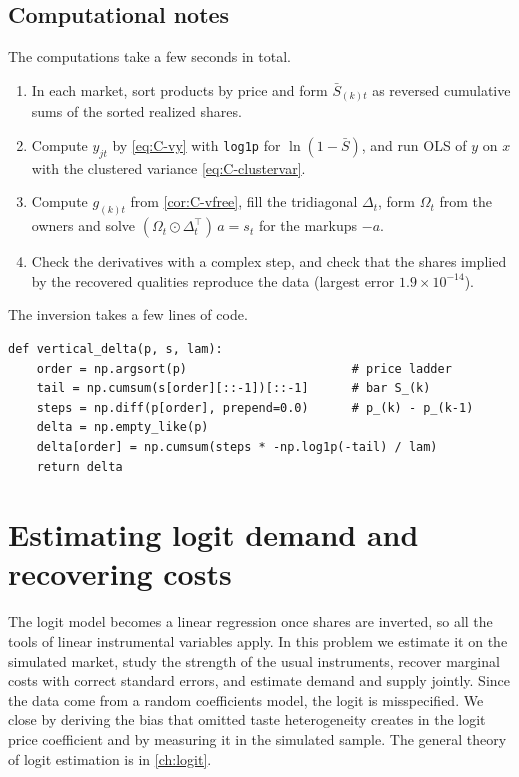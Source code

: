 \subsection{Computational notes}

The computations take a few seconds in total.
\begin{enumerate}
  \item In each market, sort products by price and form $\bar S_{(k)t}$ as reversed cumulative sums of the sorted
  realized shares.
  \item Compute $y_{jt}$ by \eqref{eq:C-vy} with \texttt{log1p} for $\ln(1 - \bar S)$, and run OLS of $y$ on $x$ with the
  clustered variance \eqref{eq:C-clustervar}.
  \item Compute $g_{(k)t}$ from \cref{cor:C-vfree}, fill the tridiagonal $\Delta_t$, form $\Omega_t$ from the owners and
  solve $(\Omega_t \odot \Delta_t^\top)\,a = s_t$ for the markups $-a$.
  \item Check the derivatives with a complex step, and check that the shares implied by the recovered qualities
  reproduce the data (largest error $1.9\times10^{-14}$).
\end{enumerate}
The inversion takes a few lines of code.
\begin{verbatim}
def vertical_delta(p, s, lam):
    order = np.argsort(p)                       # price ladder
    tail = np.cumsum(s[order][::-1])[::-1]      # bar S_(k)
    steps = np.diff(p[order], prepend=0.0)      # p_(k) - p_(k-1)
    delta = np.empty_like(p)
    delta[order] = np.cumsum(steps * -np.log1p(-tail) / lam)
    return delta
\end{verbatim}

\section{Estimating logit demand and recovering costs}\label{sec:C-logit-est}

The logit model becomes a linear regression once shares are inverted, so all the tools of linear instrumental variables
apply. In this problem we estimate it on the simulated market, study the strength of the usual instruments, recover
marginal costs with correct standard errors, and estimate demand and supply jointly. Since the data come from a random
coefficients model, the logit is misspecified. We close by deriving the bias that omitted taste heterogeneity creates in
the logit price coefficient and by measuring it in the simulated sample. The general theory of logit estimation is in \cref{ch:logit}.

